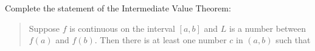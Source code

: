 \documentclass{ximera}
\author{Matthew Carr}
\begin{document}
\begin{exercise}



Complete the statement of the Intermediate Value Theorem:
\begin{quote}
Suppose $f$ is continuous on the interval $[a,b]$ and $L$ is a number between $f(a)$ and $f(b)$. Then there is at least one number $c$ in $(a,b)$ such that
\end{quote}

\begin{prompt}
\begin{multipleChoice}
\end{multipleChoice}
\end{prompt}

\end{exercise}
\end{document}
